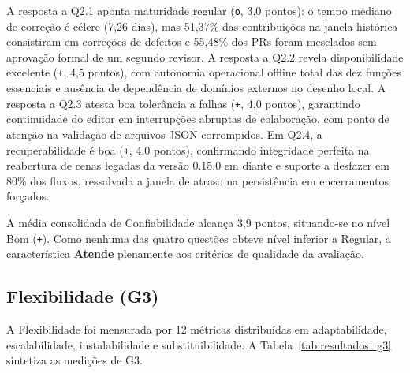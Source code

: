 \documentclass[12pt]{article}
\begin{document}
A resposta a Q2.1 aponta maturidade regular (\texttt{o}, 3,0 pontos): o tempo mediano de correção é célere (7,26 dias), mas 51,37\% das contribuições na janela histórica consistiram em correções de defeitos e 55,48\% dos PRs foram mesclados sem aprovação formal de um segundo revisor. A resposta a Q2.2 revela disponibilidade excelente (\texttt{+}, 4,5 pontos), com autonomia operacional offline total das dez funções essenciais e ausência de dependência de domínios externos no desenho local. A resposta a Q2.3 atesta boa tolerância a falhas (\texttt{+}, 4,0 pontos), garantindo continuidade do editor em interrupções abruptas de colaboração, com ponto de atenção na validação de arquivos JSON corrompidos. Em Q2.4, a recuperabilidade é boa (\texttt{+}, 4,0 pontos), confirmando integridade perfeita na reabertura de cenas legadas da versão 0.15.0 em diante e suporte a desfazer em 80\% dos fluxos, ressalvada a janela de atraso na persistência em encerramentos forçados.

A média consolidada de Confiabilidade alcança 3,9 pontos, situando-se no nível Bom (\texttt{+}). Como nenhuma das quatro questões obteve nível inferior a Regular, a característica \textbf{Atende} plenamente aos critérios de qualidade da avaliação.

\subsection{Flexibilidade (G3)}
\label{subsec:resultados-g3}

A Flexibilidade foi mensurada por 12 métricas distribuídas em adaptabilidade, escalabilidade, instalabilidade e substituibilidade. A Tabela~\ref{tab:resultados_g3} sintetiza as medições de G3.
\end{document}
